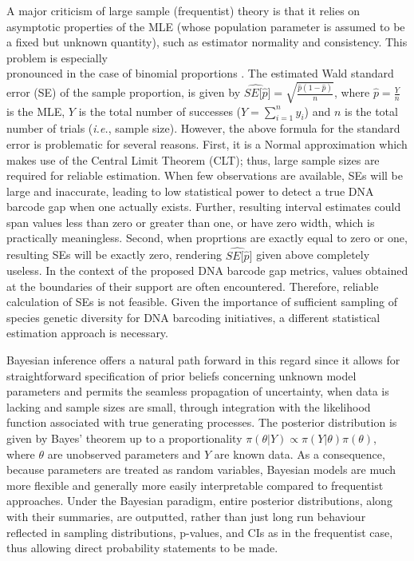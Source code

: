 \documentclass[12pt]{article}
\begin{document}
A major criticism of large sample (frequentist) theory is that it relies on asymptotic properties of the MLE (whose population parameter is assumed to be a fixed but unknown quantity), such as estimator normality and consistency. This problem is especially \\ pronounced in the case of binomial proportions \citep{newcombe1998confidence}. The estimated Wald standard error (SE) of the sample proportion, is given by $\widehat{SE[\hat{p}}] = \sqrt{\frac{\hat{p}(1 - \hat{p})}{n}}$, where $\hat{p} = \frac{Y}{n}$ is the MLE, $Y$ is the total number of successes ($Y = \sum_{i=1}^n{y_i}$) and $n$ is the total number of trials (\textit{i.e.}, sample size). However, the above formula for the standard error is problematic for several reasons. First, it is a Normal approximation which makes use of the Central Limit Theorem (CLT); thus, large sample sizes are required for reliable estimation. When few observations are available, SEs will be large and inaccurate, leading to low statistical power to detect a true DNA barcode gap when one actually exists. Further, resulting interval estimates could span values less than zero or greater than one, or have zero width, which is practically meaningless. Second, when proprtions are exactly equal to zero or one, resulting SEs will be exactly zero, rendering $\widehat{SE[\hat{p}}]$ given above completely useless. In the context of the proposed DNA barcode gap metrics, values obtained at the boundaries of their support are often encountered. Therefore, reliable calculation of SEs is not feasible. Given the importance of sufficient sampling of species genetic diversity for DNA barcoding initiatives, a different statistical estimation approach is necessary. 

Bayesian inference offers a natural path forward in this regard since it allows for \\ straightforward specification of prior beliefs concerning unknown model parameters and permits the seamless propagation of uncertainty, when data is lacking and sample sizes are small, through integration with the likelihood function associated with true generating processes. The posterior distribution is given by Bayes' theorem up to a proportionality $\pi(\theta | Y) \propto \pi(Y | \theta)\pi(\theta)$, where $\theta$ are unobserved parameters and $Y$ are known data.  As a consequence, because parameters are treated as random variables, Bayesian models are much more flexible and generally more easily interpretable compared to frequentist approaches. Under the Bayesian paradigm, entire posterior distributions, along with their summaries, are outputted, rather than just long run behaviour reflected in sampling distributions, p-values, and CIs as in the frequentist case, thus allowing direct probability statements to be made. 
\end{document}
